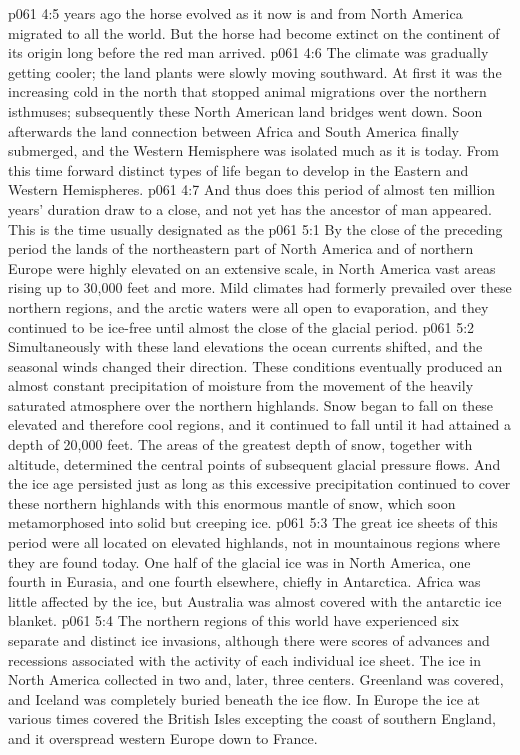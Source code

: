 \pc \vs p061 4:5  years ago the horse evolved as it now is and from North America migrated to all the world. But the horse had become extinct on the continent of its origin long before the red man arrived.
\vs p061 4:6 The climate was gradually getting cooler; the land plants were slowly moving southward. At first it was the increasing cold in the north that stopped animal migrations over the northern isthmuses; subsequently these North American land bridges went down. Soon afterwards the land connection between Africa and South America finally submerged, and the Western Hemisphere was isolated much as it is today. From this time forward distinct types of life began to develop in the Eastern and Western Hemispheres.
\pc \vs p061 4:7 And thus does this period of almost ten million years’ duration draw to a close, and not yet has the ancestor of man appeared. This is the time usually designated as the 
\vs p061 5:1 By the close of the preceding period the lands of the northeastern part of North America and of northern Europe were highly elevated on an extensive scale, in North America vast areas rising up to 30,000 feet and more. Mild climates had formerly prevailed over these northern regions, and the arctic waters were all open to evaporation, and they continued to be ice\hyp{}free until almost the close of the glacial period.
\vs p061 5:2 Simultaneously with these land elevations the ocean currents shifted, and the seasonal winds changed their direction. These conditions eventually produced an almost constant precipitation of moisture from the movement of the heavily saturated atmosphere over the northern highlands. Snow began to fall on these elevated and therefore cool regions, and it continued to fall until it had attained a depth of 20,000 feet. The areas of the greatest depth of snow, together with altitude, determined the central points of subsequent glacial pressure flows. And the ice age persisted just as long as this excessive precipitation continued to cover these northern highlands with this enormous mantle of snow, which soon metamorphosed into solid but creeping ice.\plusone
\vs p061 5:3 The great ice sheets of this period were all located on elevated highlands, not in mountainous regions where they are found today. One half of the glacial ice was in North America, one fourth in Eurasia, and one fourth elsewhere, chiefly in Antarctica. Africa was little affected by the ice, but Australia was almost covered with the antarctic ice blanket.
\vs p061 5:4 The northern regions of this world have experienced six separate and distinct ice invasions, although there were scores of advances and recessions associated with the activity of each individual ice sheet. The ice in North America collected in two and, later, three centers. Greenland was covered, and Iceland was completely buried beneath the ice flow. In Europe the ice at various times covered the British Isles excepting the coast of southern England, and it overspread western Europe down to France.
